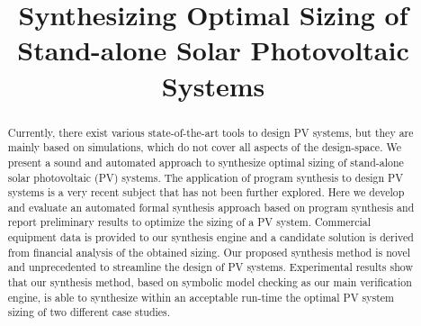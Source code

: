 \documentclass[10pt,conference]{IEEEtran}
\begin{document}
\title{Synthesizing Optimal Sizing of Stand-alone Solar Photovoltaic Systems\\
}

\author{
\and
{}
}

\maketitle

\begin{abstract}
Currently, there exist various state-of-the-art tools to design PV systems, but they are mainly based on simulations, which do not cover all aspects of the design-space. We present a sound and automated approach to synthesize optimal sizing of stand-alone solar photovoltaic (PV) systems. The application of program synthesis to design PV systems is a very recent subject that has not been further explored. Here we develop and evaluate an automated formal synthesis approach based on program synthesis and report preliminary results to optimize the sizing of a PV system. Commercial equipment data is provided to our synthesis engine and a candidate solution is derived from financial analysis of the obtained sizing. Our proposed synthesis method is novel and unprecedented to streamline the design of PV systems. Experimental results show that our synthesis method, based on symbolic model checking as our main verification engine, is able to synthesize within an acceptable run-time the optimal PV system sizing of two different case studies.
\end{abstract}


\end{document}
